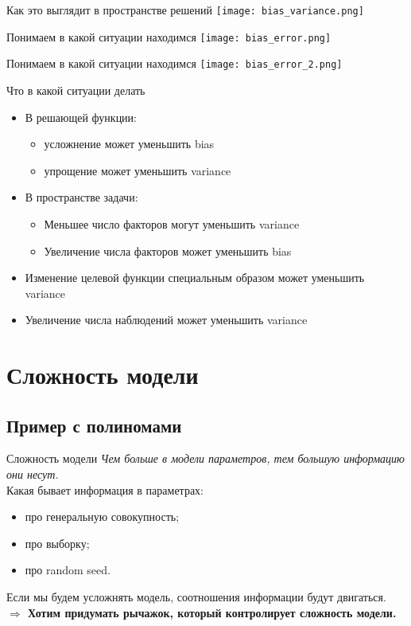 \documentclass[14pt, fleqn, xcolor={dvipsnames, table}]{beamer}
\begin{document}
\begin{frame}{Как это выглядит в пространстве решений}
\centering
\texttt{[image: bias\_variance.png]} 
\end{frame}

\begin{frame}{Понимаем в какой ситуации находимся}
\centering
\texttt{[image: bias\_error.png]}
\end{frame}

\begin{frame}{Понимаем в какой ситуации находимся}
\centering
\texttt{[image: bias\_error\_2.png]}
\end{frame}

\begin{frame}{Что в какой ситуации делать}
  \begin{itemize}
    \item В решающей функции:
    \begin{itemize}
      \item усложнение может уменьшить bias
      \item упрощение может уменьшить variance
    \end{itemize}
    \item В пространстве задачи:
    \begin{itemize}
      \item Меньшее число факторов могут уменьшить variance
      \item Увеличение числа факторов может уменьшить bias      
    \end{itemize}
    \item Изменение целевой функции специальным образом может уменьшить variance
    \item Увеличение числа наблюдений может уменьшить variance
  \end{itemize}
\end{frame}

\section{Сложность модели}
\subsection{Пример с полиномами}

\begin{frame}{Сложность модели}{}
{\em Чем больше в модели параметров, тем большую информацию они несут.}\\
\flushleft\small
Какая бывает информация в параметрах:
\begin{itemize}
  \item про генеральную совокупность;
  \item про выборку;
  \item про random seed.
\end{itemize}
Если мы будем усложнять модель, соотношения информации будут двигаться.\\

\textbf{$\Rightarrow$ Хотим придумать рычажок, который контролирует сложность модели.}
\end{frame}
\end{document}
